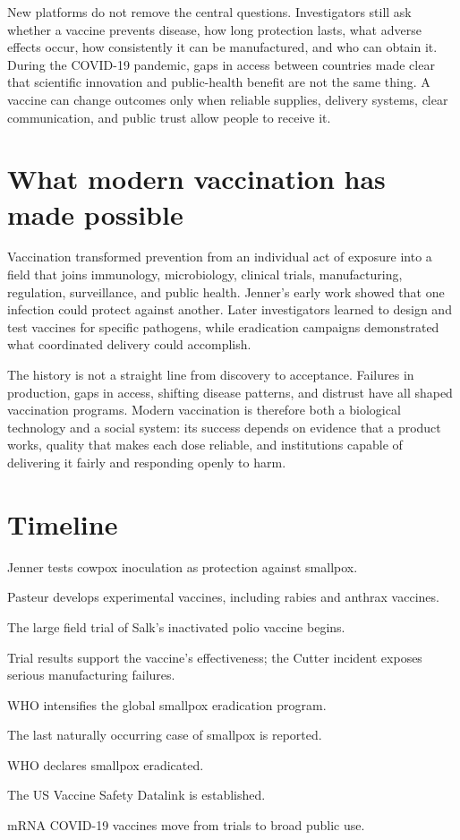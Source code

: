 \documentclass[12pt,oneside]{book}
\begin{document}
New platforms do not remove the central questions. Investigators still ask
whether a vaccine prevents disease, how long protection lasts, what adverse
effects occur, how consistently it can be manufactured, and who can obtain it.
During the COVID-19 pandemic, gaps in access between countries made clear that
scientific innovation and public-health benefit are not the same thing. A
vaccine can change outcomes only when reliable supplies, delivery systems,
clear communication, and public trust allow people to receive it.

\section{What modern vaccination has made possible}
Vaccination transformed prevention from an individual act of exposure into a
field that joins immunology, microbiology, clinical trials, manufacturing,
regulation, surveillance, and public health. Jenner's early work showed that
one infection could protect against another. Later investigators learned to
design and test vaccines for specific pathogens, while eradication campaigns
demonstrated what coordinated delivery could accomplish.

The history is not a straight line from discovery to acceptance. Failures in
production, gaps in access, shifting disease patterns, and distrust have all
shaped vaccination programs. Modern vaccination is therefore both a
biological technology and a social system: its success depends on evidence
that a product works, quality that makes each dose reliable, and institutions
capable of delivering it fairly and responding openly to harm.

\section*{Timeline}
\begin{description}[leftmargin=2.3cm,style=nextline]
  \item[1796] Jenner tests cowpox inoculation as protection against smallpox.
  \item[1880s] Pasteur develops experimental vaccines, including rabies and anthrax vaccines.
  \item[1954] The large field trial of Salk's inactivated polio vaccine begins.
  \item[1955] Trial results support the vaccine's effectiveness; the Cutter incident exposes serious manufacturing failures.
  \item[1967] WHO intensifies the global smallpox eradication program.
  \item[1977] The last naturally occurring case of smallpox is reported.
  \item[1980] WHO declares smallpox eradicated.
  \item[1990] The US Vaccine Safety Datalink is established.
  \item[2020--2021] mRNA COVID-19 vaccines move from trials to broad public use.
\end{description}
\end{document}
